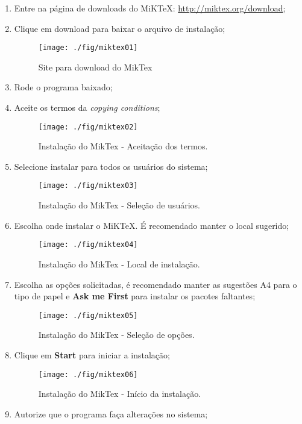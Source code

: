 \begin{enumerate}
\item Entre na página de downloads do MiKTeX: \url{http://miktex.org/download};
\item Clique em download para baixar o arquivo de instalação;
\begin{figure}[!ht]
  \centering
  \texttt{[image: ./fig/miktex01]}
  \caption{Site para download do MikTex}
  \label{fig:miktex01}
\end{figure}
\item Rode o programa baixado;
\item Aceite os termos da \textit{copying conditions};
\begin{figure}[H]
  \centering
  \texttt{[image: ./fig/miktex02]}
  \caption{Instalação do MikTex - Aceitação dos termos.}
\end{figure}
\item Selecione instalar para todos os usuários do sistema;
\begin{figure}[H]
  \centering
  \texttt{[image: ./fig/miktex03]}
  \caption{Instalação do MikTex - Seleção de usuários.}
\end{figure}
\item Escolha onde instalar o MiKTeX. É recomendado manter o local sugerido;
\begin{figure}[H]
  \centering
  \texttt{[image: ./fig/miktex04]}
  \caption{Instalação do MikTex - Local de instalação.}
\end{figure}
\item Escolha as opções solicitadas, é recomendado manter as sugestões A4 para o tipo de papel e \textbf{Ask me First} para instalar os pacotes faltantes;
\begin{figure}[H]
  \centering
  \texttt{[image: ./fig/miktex05]}
  \caption{Instalação do MikTex - Seleção de opções.}
\end{figure}
\item Clique em \textbf{Start} para iniciar a instalação;
\begin{figure}[H]
  \centering
  \texttt{[image: ./fig/miktex06]}
  \caption{Instalação do MikTex - Início da instalação.}
\end{figure}
\item Autorize que o programa faça alterações no sistema;

\end{enumerate}
